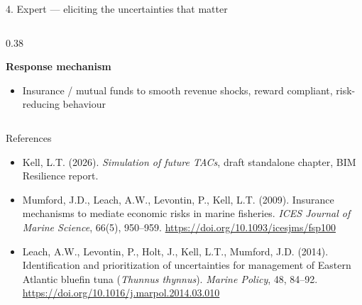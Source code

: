 \documentclass[10pt,aspectratio=169]{beamer}
\begin{document}
\begin{frame}{4. Expert --- eliciting the uncertainties that matter}
\begin{columns}[T]
\begin{column}{0.38\textwidth}
\begin{itemize}
      \end{itemize}
      \vspace{2mm}
      \textbf{Response mechanism}
      \begin{itemize}
        \item Insurance / mutual funds to smooth revenue shocks, reward compliant, risk-reducing behaviour
      \end{itemize}
    \end{column}
  \end{columns}
\end{frame}

\begin{frame}{References}
  \footnotesize
  \begin{itemize}
    \item Kell, L.T. (2026). \textit{Simulation of future TACs}, draft standalone chapter, BIM Resilience report.
    \item Mumford, J.D., Leach, A.W., Levontin, P., Kell, L.T. (2009). Insurance mechanisms to mediate economic risks in marine fisheries. \textit{ICES Journal of Marine Science}, 66(5), 950--959. \url{https://doi.org/10.1093/icesjms/fsp100}
    \item Leach, A.W., Levontin, P., Holt, J., Kell, L.T., Mumford, J.D. (2014). Identification and prioritization of uncertainties for management of Eastern Atlantic bluefin tuna (\textit{Thunnus thynnus}). \textit{Marine Policy}, 48, 84--92. \url{https://doi.org/10.1016/j.marpol.2014.03.010}
  \end{itemize}
\end{frame}
\end{document}

